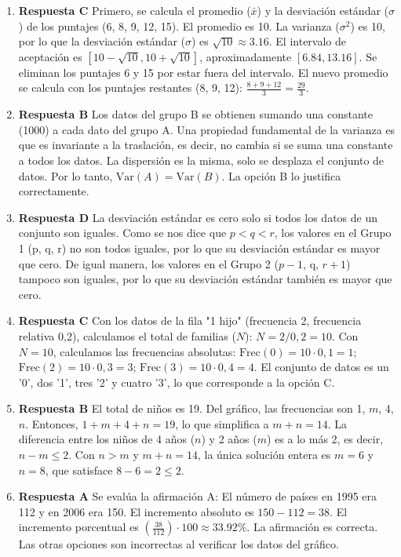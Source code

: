 \documentclass[11pt]{article}
\begin{document}
\begin{enumerate}
    \item \textbf{Respuesta C} Primero, se calcula el promedio ($\bar{x}$) y la desviación estándar ($\sigma$) de los puntajes (6, 8, 9, 12, 15). El promedio es 10. La varianza ($\sigma^2$) es 10, por lo que la desviación estándar ($\sigma$) es $\sqrt{10} \approx 3.16$. El intervalo de aceptación es $[10-\sqrt{10}, 10+\sqrt{10}]$, aproximadamente $[6.84, 13.16]$. Se eliminan los puntajes 6 y 15 por estar fuera del intervalo. El nuevo promedio se calcula con los puntajes restantes (8, 9, 12): $\frac{8+9+12}{3} = \frac{29}{3}$. %
    
    \item \textbf{Respuesta B} Los datos del grupo B se obtienen sumando una constante (1000) a cada dato del grupo A. Una propiedad fundamental de la varianza es que es invariante a la traslación, es decir, no cambia si se suma una constante a todos los datos. La dispersión es la misma, solo se desplaza el conjunto de datos. Por lo tanto, $\text{Var}(A) = \text{Var}(B)$. La opción B lo justifica correctamente. %
    
    \item \textbf{Respuesta D} La desviación estándar es cero solo si todos los datos de un conjunto son iguales. Como se nos dice que $p < q < r$, los valores en el Grupo 1 (p, q, r) no son todos iguales, por lo que su desviación estándar es mayor que cero. De igual manera, los valores en el Grupo 2 ($p-1$, q, $r+1$) tampoco son iguales, por lo que su desviación estándar también es mayor que cero. %
    
    \item \textbf{Respuesta C} Con los datos de la fila "1 hijo" (frecuencia 2, frecuencia relativa 0,2), calculamos el total de familias ($N$): $N = 2 / 0,2 = 10$. Con $N=10$, calculamos las frecuencias absolutas: $\text{Frec}(0) = 10 \cdot 0,1 = 1$; $\text{Frec}(2) = 10 \cdot 0,3 = 3$; $\text{Frec}(3) = 10 \cdot 0,4 = 4$. El conjunto de datos es un '0', dos '1', tres '2' y cuatro '3', lo que corresponde a la opción C. %
    
    \item \textbf{Respuesta B} El total de niños es 19. Del gráfico, las frecuencias son 1, $m$, 4, $n$. Entonces, $1+m+4+n=19$, lo que simplifica a $m+n=14$. La diferencia entre los niños de 4 años ($n$) y 2 años ($m$) es a lo más 2, es decir, $n-m \leq 2$. Con $n > m$ y $m+n=14$, la única solución entera es $m=6$ y $n=8$, que satisface $8-6=2 \leq 2$. %

    \item \textbf{Respuesta A} Se evalúa la afirmación A: El número de países en 1995 era 112 y en 2006 era 150. El incremento absoluto es $150 - 112 = 38$. El incremento porcentual es $(\frac{38}{112}) \cdot 100 \approx 33.92\%$. La afirmación es correcta. Las otras opciones son incorrectas al verificar los datos del gráfico. %
    

\end{enumerate}
\end{document}
